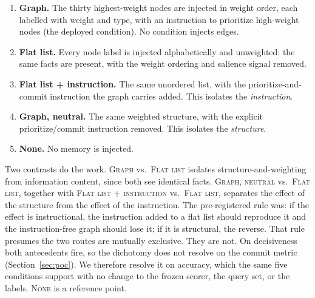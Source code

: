 \documentclass[11pt]{article}
\begin{document}
\begin{enumerate}
  \item \textbf{Graph.} The thirty highest-weight nodes are injected in weight order, each labelled with weight and type, with an instruction to prioritize high-weight nodes (the deployed condition). No condition injects edges.
  \item \textbf{Flat list.} Every node label is injected alphabetically and unweighted: the same facts are present, with the weight ordering and salience signal removed.
  \item \textbf{Flat list + instruction.} The same unordered list, with the prioritize-and-commit instruction the graph carries added. This isolates the \emph{instruction}.
  \item \textbf{Graph, neutral.} The same weighted structure, with the explicit prioritize/commit instruction removed. This isolates the \emph{structure}.
  \item \textbf{None.} No memory is injected.
\end{enumerate}

Two contrasts do the work. \textsc{Graph} vs.\ \textsc{Flat list} isolates structure-and-weighting from information content, since both see identical facts. \textsc{Graph, neutral} vs.\ \textsc{Flat list}, together with \textsc{Flat list + instruction} vs.\ \textsc{Flat list}, separates the effect of the structure from the effect of the instruction. The pre-registered rule was: if the effect is instructional, the instruction added to a flat list should reproduce it and the instruction-free graph should lose it; if it is structural, the reverse. That rule presumes the two routes are mutually exclusive. They are not. On decisiveness both antecedents fire, so the dichotomy does not resolve on the commit metric (Section~\ref{sec:poc}). We therefore resolve it on accuracy, which the same five conditions support with no change to the frozen scorer, the query set, or the labels. \textsc{None} is a reference point.
\end{document}
